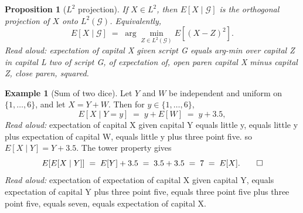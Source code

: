 \documentclass[11pt]{article}
\newtheorem{proposition}[theorem]{Proposition}
\theoremstyle{definition}
\newtheorem{example}[theorem]{Example}
\begin{document}
\begin{proposition}[$L^2$ projection]
If $X \in L^2$, then $E[X \mid \mathcal{G}]$ is the orthogonal projection of $X$ onto $L^2(\mathcal{G})$. Equivalently,
\[
E[X \mid \mathcal{G}] \;=\; \arg\min_{Z \in L^2(\mathcal{G})} E\!\left[(X - Z)^2\right].
\]
\emph{Read aloud:} expectation of capital X given script G equals arg-min over capital Z in capital L two of script G, of expectation of, open paren capital X minus capital Z, close paren, squared.
\end{proposition}

\begin{example}[Sum of two dice]
Let $Y$ and $W$ be independent and uniform on $\{1, \dots, 6\}$, and let $X = Y + W$. Then for $y \in \{1, \dots, 6\}$,
\[
E[X \mid Y = y] \;=\; y + E[W] \;=\; y + 3.5,
\]
\emph{Read aloud:} expectation of capital X given capital Y equals little y, equals little y plus expectation of capital W, equals little y plus three point five.
so $E[X \mid Y] = Y + 3.5$. The tower property gives
\[
E[E[X \mid Y]] \;=\; E[Y] + 3.5 \;=\; 3.5 + 3.5 \;=\; 7 \;=\; E[X]. \qed
\]
\emph{Read aloud:} expectation of expectation of capital X given capital Y, equals expectation of capital Y plus three point five, equals three point five plus three point five, equals seven, equals expectation of capital X.
\end{example}
\end{document}
